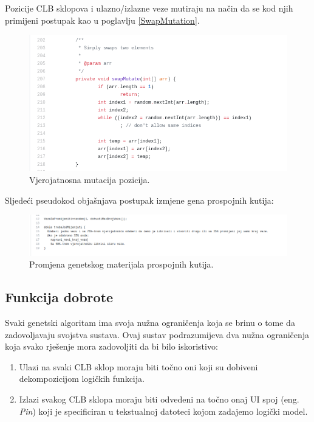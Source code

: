 \documentclass[times, utf8, zavrsni]{fer}
\begin{document}
Pozicije CLB sklopova i ulazno/izlazne veze mutiraju na način da se kod njih primijeni postupak kao u poglavlju \ref{SwapMutation}.

\begin{figure}[H]
	\centering
	\includegraphics[width=18cm]{slike/swapMutate.png}
	\caption{Vjerojatnosna mutacija pozicija. }
	\label{fig:sw-boxes-mutation}
\end{figure} 

Sljedeći pseudokod objašnjava postupak izmjene gena prospojnih kutija: 

\begin{figure}[H]
	\centering
	\includegraphics[width=18cm]{slike/pseudokod.png}
	\caption{Promjena genetskog materijala prospojnih kutija.}
	\label{fig:pseudokod-prospojne}
\end{figure} 









\subsection{Funkcija dobrote}

Svaki genetski algoritam ima svoja nužna ograničenja koja se brinu o tome da zadovoljavaju svojstva sustava. Ovaj sustav podrazumijeva dva nužna ograničenja koja svako rješenje mora zadovoljiti da bi bilo iskoristivo:

\begin{enumerate}
	\item Ulazi na svaki CLB sklop moraju biti točno oni koji su dobiveni dekompozicijom logičkih funkcija.
 	\item Izlazi svakog CLB sklopa moraju biti odvedeni na točno onaj UI spoj (eng. \emph{Pin}) koji je specificiran u tekstualnoj datoteci kojom zadajemo logički model.
\end{enumerate}
\end{document}

